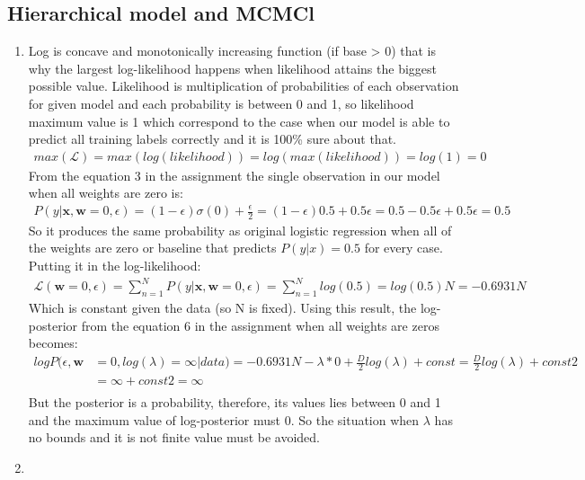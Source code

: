 \documentclass{article}
\newcommand{\vect}[1]{\boldsymbol{#1}} %
\begin{document}
				\subsection{Hierarchical model and MCMCl}
					\begin{enumerate}[label=(\alph*)]
						\item 
							Log is concave and monotonically increasing function (if base > 0) that is why the largest log-likelihood happens when likelihood attains the biggest possible value. Likelihood is multiplication of probabilities of each observation for given model and each probability is between 0 and 1, so likelihood maximum value is 1 which correspond to the case when our model is able to predict all training labels correctly and it is 100\% sure about that.  
							\begin{align*}
							max(\mathcal{L})=max(log(likelihood)) = log(max(likelihood))=log(1)=0
							\end{align*}
							From the equation 3 in the assignment the single observation in our model  when all weights are zero is:
							\begin{align*}
							P(y| \vect{x}, \vect{w}=0, \epsilon) = (1 - \epsilon) \sigma(0) + \frac{\epsilon}{2}=(1-\epsilon)0.5 + 0.5\epsilon = 0.5 - 0.5\epsilon + 0.5\epsilon = 0.5
							\end{align*}
							So it produces the same probability as original logistic regression when all of the weights are zero or baseline that predicts $P(y | x) =0.5$ for every case. Putting it in the log-likelihood:
							\begin{align*}
							\mathcal{L}(\vect{w}=0, \epsilon)=\sum_{n=1}^{N}P(y| \vect{x}, \vect{w}=0, \epsilon)=\sum_{n=1}^{N}log(0.5)=log(0.5)N = -0.6931N
							\end{align*}
							Which is constant given the data (so N is fixed).
							Using this result, the log-posterior from the equation 6 in the assignment when all weights are zeros becomes:
							\begin{align*}
							logP(\epsilon, \vect{w} &=0, log( \lambda)=\infty | data) = -0.6931N - \lambda * 0 + \frac{D}{2}log(\lambda) + const =  \frac{D}{2}log(\lambda) + const2 \\
							&= \infty + const2 = \infty \\
							\end{align*}
							But the posterior is a probability, therefore, its values lies between 0 and 1 and the maximum value of log-posterior must 0. So the situation when $\lambda$ has no bounds and it is not finite value must be avoided.
						\item 
						

\end{enumerate}
\end{document}
